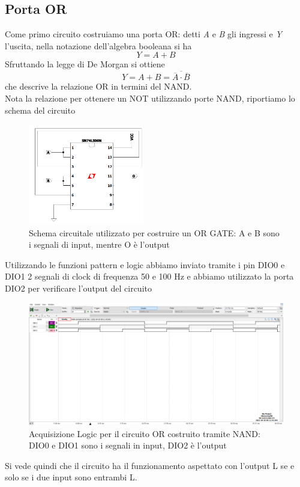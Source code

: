 \documentclass[10pt, a4paper, italian]{article}
\begin{document}
\subsection{Porta OR}
Come primo circuito costruiamo una porta OR: detti \textit{A} e \textit{B}
gli ingressi e \textit{Y} l'uscita, nella notazione dell'algebra booleana si ha
\[
    Y = A + B
\]
Sfruttando la legge di De Morgan si ottiene
\[
    Y = A + B = \overline{\overline{A}\cdot\overline{B}}
\]
che descrive la relazione OR in termini del NAND.\\
Nota la relazione per ottenere un NOT utilizzando porte NAND, riportiamo lo schema del circuito
\begin{figure}[htbp]
    \centering
    \includegraphics[width=0.45\textwidth]{NAND_OR}
    \caption{\label{fig: OR} Schema circuitale utilizzato per costruire un OR GATE: A e B sono i segnali di input, mentre O è l'output}
\end{figure}

Utilizzando le funzioni pattern e logic abbiamo inviato tramite i pin DIO0 e DIO1 2 segnali di clock di frequenza 50 e 100 Hz e abbiamo utilizzato la porta DIO2 per verificare l'output del circuito
\begin{figure}[htbp]
    \centering
    \includegraphics[width=\textwidth]{or_time}
    \caption{Acquisizione Logic per il circuito OR costruito tramite NAND: DIO0 e DIO1 sono i segnali in input, DIO2 è l'output}
\end{figure}
Si vede quindi che il circuito ha il funzionamento aspettato con l'output L se e solo se i due input sono entrambi L.
\end{document}
